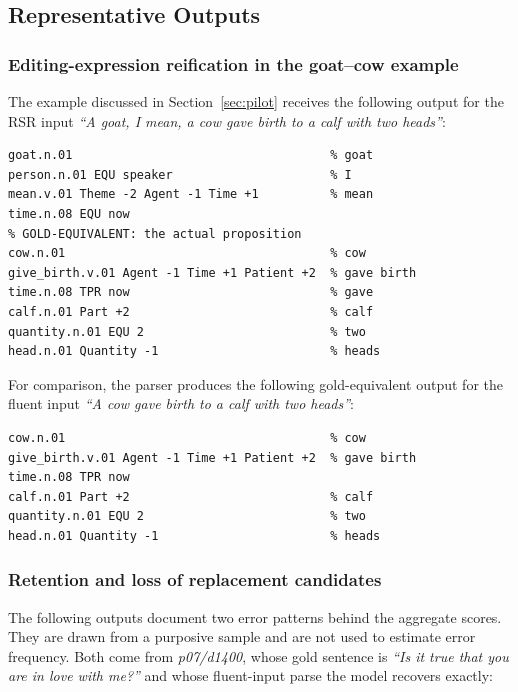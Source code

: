 \documentclass{article}
\begin{document}
\subsection{Representative Outputs}

\subsubsection{Editing-expression reification in the goat--cow example}
\label{app:pilot-goat-cow}

The example discussed in Section~\ref{sec:pilot} receives the following
output for the RSR input \textit{``A goat, I mean, a cow gave birth to a calf
with two heads''}:

\begin{lstlisting}[style=sbn]
% SPURIOUS: editing-expression material reified as content
goat.n.01                                    % goat
person.n.01 EQU speaker                      % I
mean.v.01 Theme -2 Agent -1 Time +1          % mean
time.n.08 EQU now
% GOLD-EQUIVALENT: the actual proposition
cow.n.01                                     % cow
give_birth.v.01 Agent -1 Time +1 Patient +2  % gave birth
time.n.08 TPR now                            % gave
calf.n.01 Part +2                            % calf
quantity.n.01 EQU 2                          % two
head.n.01 Quantity -1                        % heads
\end{lstlisting}

For comparison, the parser produces the following gold-equivalent output for
the fluent input \textit{``A cow gave birth to a calf with two heads''}:

\begin{lstlisting}[style=sbn]
cow.n.01                                     % cow
give_birth.v.01 Agent -1 Time +1 Patient +2  % gave birth
time.n.08 TPR now
calf.n.01 Part +2                            % calf
quantity.n.01 EQU 2                          % two
head.n.01 Quantity -1                        % heads
\end{lstlisting}

\subsubsection{Retention and loss of replacement candidates}

The following outputs document two error patterns behind the aggregate scores.
They are drawn from a purposive sample and are not used to estimate error
frequency. Both come from \textit{p07/d1400}, whose gold sentence is
\textit{``Is it true that you are in love with me?''} and whose fluent-input parse the
model recovers exactly:
\end{document}

